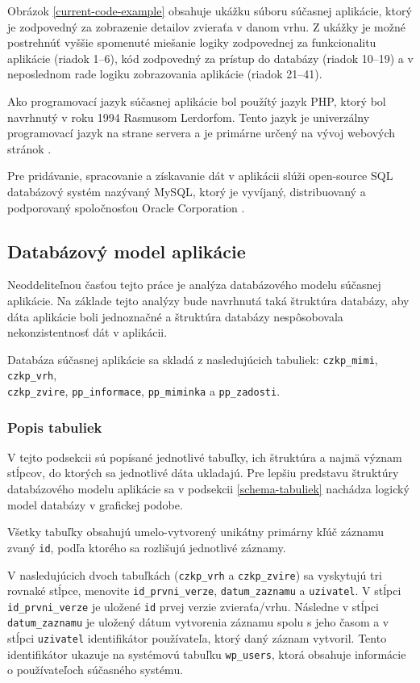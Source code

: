 Obrázok \ref{current-code-example} obsahuje ukážku súboru súčasnej aplikácie, ktorý je zodpovedný za zobrazenie detailov zvieraťa v danom vrhu. Z ukážky je možné postrehnúť vyššie spomenuté miešanie logiky zodpovednej za funkcionalitu aplikácie (riadok 1--6), kód zodpovedný za prístup do databázy (riadok 10--19) a v neposlednom rade logiku zobrazovania aplikácie (riadok 21--41).

Ako programovací jazyk súčasnej aplikácie bol použítý jazyk PHP, ktorý bol navrhnutý v roku 1994 Rasmusom Lerdorfom. Tento jazyk je univerzálny programovací jazyk na strane servera a je primárne určený na vývoj webových stránok \cite{co-je-php}.

Pre pridávanie, spracovanie a získavanie dát v aplikácii slúži open-source SQL databázový systém nazývaný MySQL, ktorý je vyvíjaný, distribuovaný a podporovaný spoločnosťou Oracle Corporation \cite{co-je-mysql}. 

\subsection{Databázový model aplikácie}\label{sucasny-model-db}
Neoddeliteľnou časťou tejto práce je analýza databázového modelu súčasnej aplikácie. Na základe tejto analýzy bude navrhnutá taká štruktúra databázy, aby dáta aplikácie boli jednoznačné a štruktúra databázy nespôsobovala nekonzistentnosť dát v aplikácii.

Databáza súčasnej aplikácie sa skladá z nasledujúcich tabuliek: \texttt{czkp_mimi}, \texttt{czkp_vrh},\\ \texttt{czkp_zvire}, \texttt{pp_informace}, \texttt{pp_miminka} a \texttt{pp_zadosti}.

\subsubsection{Popis tabuliek}
V tejto podsekcii sú popísané jednotlivé tabuľky, ich štruktúra a najmä význam stĺpcov, do ktorých sa jednotlivé dáta ukladajú.
Pre lepšiu predstavu štruktúry databázového modelu aplikácie sa v podsekcii \ref{schema-tabuliek} nachádza logický model databázy v grafickej podobe. 

Všetky tabuľky obsahujú umelo-vytvorený unikátny primárny kľúč záznamu zvaný \texttt{id}, podľa ktorého sa rozlišujú jednotlivé záznamy.

V nasledujúcich dvoch tabuľkách (\texttt{czkp_vrh} a \texttt{czkp_zvire}) sa vyskytujú tri rovnaké stĺpce, menovite \texttt{id_prvni_verze},  \texttt{datum_zaznamu} a  \texttt{uzivatel}. V stĺpci \texttt{id_prvni_verze} je uložené  \texttt{id} prvej verzie zvieraťa/vrhu. Následne v stĺpci \texttt{datum_zaznamu} je uložený dátum vytvorenia záznamu spolu s jeho časom a v stĺpci \texttt{uzivatel} identifikátor používateľa, ktorý daný záznam vytvoril. Tento identifikátor ukazuje na systémovú tabuľku \texttt{wp_users}, ktorá obsahuje informácie o používateľoch súčasného systému.

